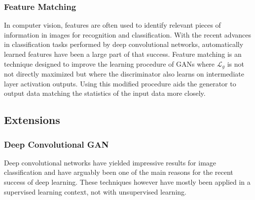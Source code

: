 


\subsubsection{Feature Matching}
\label{ssub:gan_feature_matching}
In computer vision, features are often used to identify relevant pieces of information in images for recognition and classification.
With the recent advances in classification tasks performed by deep convolutional networks, automatically learned features have been a large part of that success.
Feature matching is an technique designed to improve the learning procedure of GANs where $\mathcal{L}_g$ is not not directly maximized but where the discriminator also learns on intermediate layer activation outputs.
Using this modified procedure aids the generator to output data matching the statistics of the input data more closely.






\subsection{Extensions}
\label{sub:gan_extensions}

\subsubsection{Deep Convolutional GAN}
\label{ssub:dcgan}
Deep convolutional networks\cite{lecun-89e} have yielded impressive results for image classification \cite{imagenet:2012} and have arguably been one of the main reasons for the recent success of deep learning.
These techniques however have mostly been applied in a supervised learning context, not with unsupervised learning.

